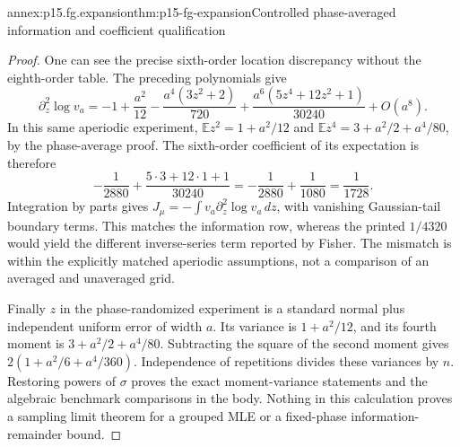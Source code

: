 \begin{annexitem}{annex:p15.fg.expansion}{thm:p15-fg-expansion}{Controlled phase-averaged information and coefficient qualification}
\begin{proof}
One can see the precise sixth-order location discrepancy without the
eighth-order table. The preceding polynomials give
\[
 \partial_z^2\log v_a=-1+\frac{a^2}{12}
  -\frac{a^4(3z^2+2)}{720}
  +\frac{a^6(5z^4+12z^2+1)}{30240}+O(a^8).
\]
In this same aperiodic experiment,
\(\mathbb Ez^2=1+a^2/12\) and
\(\mathbb Ez^4=3+a^2/2+a^4/80\), by the phase-average proof.
The sixth-order coefficient of its expectation is therefore
\[
 -\frac1{2880}+\frac{5\cdot3+12\cdot1+1}{30240}
 =-\frac1{2880}+\frac1{1080}=\frac1{1728}.
\]
Integration by parts gives
\(J_\mu=-\int v_a\partial_z^2\log v_a\,dz\), with vanishing
Gaussian-tail boundary terms. This matches the information row, whereas
the printed \(1/4320\) would yield the different inverse-series term
reported by Fisher. The mismatch is within the explicitly matched
aperiodic assumptions, not a comparison of an averaged and unaveraged grid.

Finally \(z\) in the phase-randomized experiment is a standard normal
plus independent uniform error of width \(a\). Its variance is
\(1+a^2/12\), and its fourth moment is \(3+a^2/2+a^4/80\).
Subtracting the square of the second moment gives
\(2(1+a^2/6+a^4/360)\). Independence of repetitions divides these
variances by \(n\). Restoring powers of \(\sigma\) proves the exact
moment-variance statements and the algebraic benchmark comparisons in
the body. Nothing in this calculation proves a sampling limit theorem
for a grouped MLE or a fixed-phase information-remainder bound.
\end{proof}
\end{annexitem}
